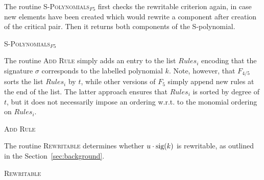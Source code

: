 The routine \textsc{S-Polynomials}$_{F5}$ first checks the rewritable criterion again, in case new elements have been created which would rewrite a component after creation of the critical pair. Then it returns both components of the S-polynomial.

\begin{algorithm}[htbp]
\caption{\textsc{S-Polynomials}$_{F5}$}
\label{alg:compspols} 
\end{algorithm}

The routine \textsc{Add Rule} simply adds an entry to the list $Rules_i$ encoding that the signature $\sigma$ corresponds to the labelled polynomial $k$.
Note, however, that $F_{4/5}$ sorts the list $Rules_i$ by $t$, while other versions of $F_5$ simply append new rules at the end of the list. The latter approach ensures that $Rules_i$ is sorted by degree of $t$, but it does not necessarily impose an ordering w.r.t. to the monomial ordering on $Rules_i$. 

\begin{algorithm}
\caption{\textsc{Add Rule}}
\label{alg:addrule} 
\end{algorithm}

The routine \textsc{Rewritable} determines whether $u\cdot\textnormal{sig}(k)$ is rewritable, as outlined in the Section~\ref{sec:background}.

\begin{algorithm}
\caption{\textsc{Rewritable}}
\label{alg:rewritable} 
\end{algorithm}


